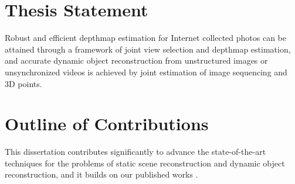 \section{Thesis Statement}
Robust and efficient depthmap estimation for Internet collected photos can be attained through a framework of joint view selection and depthmap estimation, and accurate dynamic object reconstruction from unstructured images or unsynchronized videos is achieved by joint estimation of image sequencing and 3D points.

\section{Outline of Contributions}
This dissertation contributes significantly to advance the state-of-the-art techniques for the problems of static scene reconstruction and dynamic object reconstruction, and it builds on our published works \cite{zheng2014patchmatch,zheng2014joint,zhengiccv_2015}.

